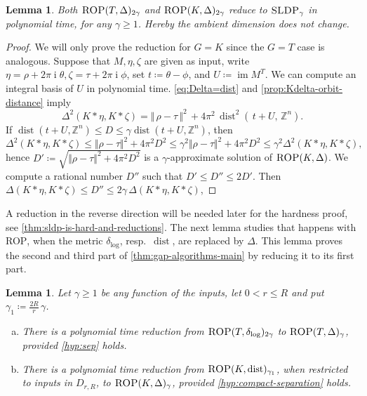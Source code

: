 \documentclass[10pt,a4paper]{article}
\newtheorem{lemma}[theorem]{Lemma}
\theoremstyle{definition}
\newenvironment{alphaenumerate}{\begin{enumerate}[(a)]}{\end{enumerate}}
\DeclareMathOperator{\ii}{i}
\DeclareMathOperator{\dist}{dist}
\newcommand{\distLD}{\delta_{\log}}
\DeclareMathOperator{\ran}{im}
\newcommand{\ZZ}{\mathbb{Z}}
\numberwithin{equation}{section}
\begin{document}
\begin{lemma}\label{le:ROP-SLP}
Both $\textsc{ROP}(T,\Delta)_{2\gamma}$ and
$\textsc{ROP}(K,\Delta)_{2\gamma}$
reduce to $\textsc{SLDP}_{\gamma}$ in polynomial time,
for any $\gamma \ge 1$.
Hereby the ambient dimension does not change.
\end{lemma}

\begin{proof}
We will only prove the reduction for $G=K$ since the $G=T$ case is analogous.
Suppose that $M,\eta,\zeta$ are given as input, write
$\eta=\rho+2\pi\ii\theta, \zeta=\tau+2\pi\ii\phi$,
set $t\coloneqq \theta-\phi$, and
$U\coloneqq \ran M^T$.
We can compute an integral basis of $U$ in polynomial time.
 \cref{eq:Delta=dist} and \cref{prop:Kdelta-orbit-distance} imply
\[
\Delta^2(K\ast \eta,K\ast\zeta)
   = \Vert\, \rho-\tau\,\Vert^2 \, + 4\pi^2 \, \dist^2(\,t + U, \, \ZZ^n) .
\]
If $\dist(t+U,\ZZ^n)\leq D\leq \gamma \dist(t+U,\ZZ^n)$, then
\[
 \Delta^2(K\ast\eta,K\ast\zeta)\leq \Vert \rho-\tau\Vert^2 + 4\pi^2 D^2
   \leq \gamma^2 \Vert\rho-\tau\Vert^2 + 4\pi^2 D^2 \leq \gamma^2 \Delta^2(K\ast\eta,K\ast\zeta),
\]
hence $D'\coloneqq \sqrt{\Vert \rho-\tau\Vert^2 + 4\pi^2 D^2}$ is a $\gamma$-approximate solution of
$\textsc{ROP}(K,\Delta)$.
We compute a rational number $D''$ such that $D'\leq D''\leq 2 D'$. Then
$\Delta(K\ast\eta,K\ast\zeta) \leq D''\leq 2 \gamma \, \Delta(K\ast\eta,K\ast\zeta)$,
\end{proof}

A reduction in the reverse direction will be needed later for the hardness proof,
see \cref{thm:sldp-is-hard-and-reductions}.
The next lemma studies that happens with \textsc{ROP}, when the
metric $\distLD$, resp.~$\dist$, are replaced by $\Delta$.
This lemma proves the second and third part of \cref{thm:gap-algorithms-main}
by reducing it to its first part.

\begin{lemma}
\label{prop:delta-to-Delta-reduction}
Let $\gamma \ge 1$ be any function of the inputs, let $0 <r \le R$
and put $\gamma_1\coloneqq \frac{2R}{r}\,\gamma$.
\begin{alphaenumerate}
\item\label{it:dD 1}
There is a polynomial time reduction from
$\textsc{ROP}(T,\distLD)_{2\gamma}$ to $\textsc{ROP}(T,\Delta)_{\gamma}$,
provided  \cref{hyp:sep} holds.

\item\label{it:dD 2}
There is a polynomial time reduction from
$\textsc{ROP}(K,\dist)_{\gamma_1}$, when restricted to inputs in $D_{r,R}$,
to $\textsc{ROP}(K,\Delta)_{\gamma}$,
provided \cref{hyp:compact-separation} holds.
\end{alphaenumerate}
\end{lemma}
\end{document}

